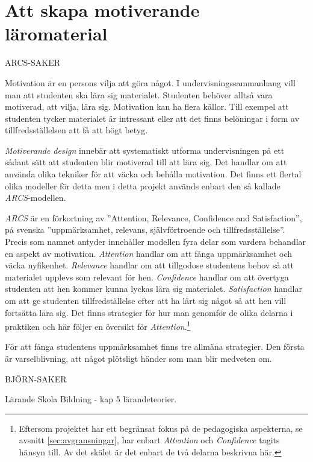 \section{Att skapa motiverande läromaterial}
\label{sec:arcs}
\begin{binge}
ARCS-SAKER

Motivation är en persons vilja att göra något. I undervisningssammanhang vill man att studenten ska lära sig materialet. Studenten behöver alltså vara motiverad, att vilja, lära sig. Motivation kan ha flera källor. Till exempel att studenten tycker materialet är intressant eller att det finns belöningar i form av tillfredsställelsen att få att högt betyg. 

\textit{Motiverande design} innebär att systematiskt utforma undervisningen på ett sådant sätt att studenten blir motiverad till att lära sig. Det handlar om att använda olika tekniker för att väcka och behålla motivation. Det finns ett flertal olika modeller för detta men i detta projekt används enbart den så kallade \textit{ARCS}-modellen.\cite{arcs_book}

\textit{ARCS} är en förkortning av ''Attention, Relevance, Confidence and Satisfaction'', på svenska ''uppmärksamhet, relevans, självförtroende och tillfredsställelse''. Precis som namnet antyder innehåller modellen fyra delar som vardera behandlar en aspekt av motivation. \textit{Attention} handlar om att fånga uppmärksamhet och väcka nyfikenhet. \textit{Relevance} handlar om att tillgodose studentens behov så att materialet upplevs som relevant för hen. \textit{Confidence} handlar om att övertyga studenten att hen kommer kunna lyckas lära sig materialet. \textit{Satisfaction} handlar om att ge studenten tillfredställelse efter att ha lärt sig något så att hen vill fortsätta lära sig. Det finns strategier för hur man genomför de olika delarna i praktiken och här följer en översikt för \textit{Attention}.\footnote{Eftersom projektet har ett begränsat fokus på de pedagogiska aspekterna, se avsnitt \ref{sec:avgransningar}, har enbart \textit{Attention} och \textit{Confidence} tagits hänsyn till. Av det skälet är det enbart de två delarna beskrivna här.}

För att fånga studentens uppmärksamhet finns tre allmäna strategier. Den första är varselblivning, att något plötsligt händer som man blir medveten om. 



BJÖRN-SAKER

    Lärande Skola Bildning - kap 5 lärandeteorier\cite{LSB}.


\end{binge}
